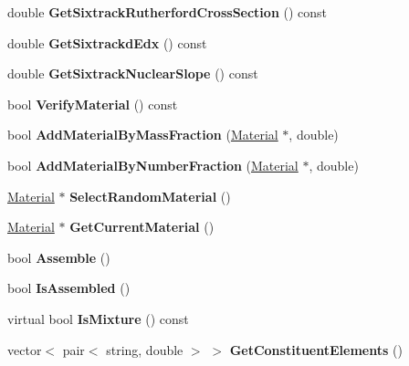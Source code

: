 \begin{DoxyCompactItemize}
double {\bfseries Get\+Sixtrack\+Rutherford\+Cross\+Section} () const
\item 
\mbox{\label{classCompositeMaterial_aaebafbc87f92617435eadf08443d7553}} 
double {\bfseries Get\+Sixtrackd\+Edx} () const
\item 
\mbox{\label{classCompositeMaterial_ac5ed48551361a5ddd874d50861e55e48}} 
double {\bfseries Get\+Sixtrack\+Nuclear\+Slope} () const
\item 
\mbox{\label{classCompositeMaterial_a55e5872e47265b1c508e2703fc11136f}} 
bool {\bfseries Verify\+Material} () const
\item 
\mbox{\label{classCompositeMaterial_a79cc20acca42097c03158e7226577c30}} 
bool {\bfseries Add\+Material\+By\+Mass\+Fraction} (\hyperlink{classMaterial}{Material} $\ast$, double)
\item 
\mbox{\label{classCompositeMaterial_a57c206edc2c73a2538adac685e920a67}} 
bool {\bfseries Add\+Material\+By\+Number\+Fraction} (\hyperlink{classMaterial}{Material} $\ast$, double)
\item 
\mbox{\label{classCompositeMaterial_a1b18895aa44371dbb3ba083551bca374}} 
\hyperlink{classMaterial}{Material} $\ast$ {\bfseries Select\+Random\+Material} ()
\item 
\mbox{\label{classCompositeMaterial_a9e554e29728b41919a889c14fdbceb4e}} 
\hyperlink{classMaterial}{Material} $\ast$ {\bfseries Get\+Current\+Material} ()
\item 
\mbox{\label{classCompositeMaterial_aaa3e26958a021b1d36c5e6d845a3658d}} 
bool {\bfseries Assemble} ()
\item 
\mbox{\label{classCompositeMaterial_a1624e66e7aeac60d853113f5fc43d634}} 
bool {\bfseries Is\+Assembled} ()
\item 
\mbox{\label{classCompositeMaterial_a50db7787a5a2b4399798dca825b8ab1d}} 
virtual bool {\bfseries Is\+Mixture} () const
\item 
\mbox{\label{classCompositeMaterial_a179b0ed456a5f2177ca905a441a7e411}} 
vector$<$ pair$<$ string, double $>$ $>$ {\bfseries Get\+Constituent\+Elements} ()
\end{DoxyCompactItemize}
